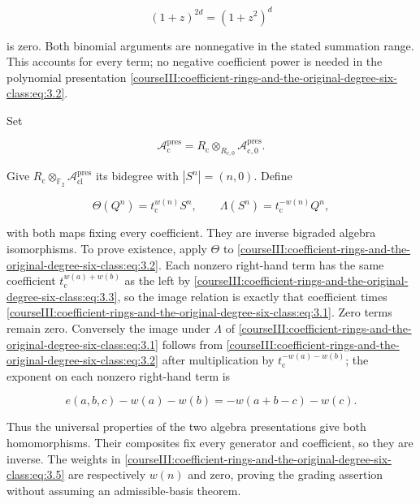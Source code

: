 \begin{equation}
(1+z)^{2d}=(1+z^2)^d
 \label{courseIII:coefficient-rings-and-the-original-degree-six-class:eq:3.4}
\end{equation}

is zero. Both binomial arguments are nonnegative in the stated summation range. This accounts for every term; no negative coefficient power is needed in the polynomial presentation \eqref{courseIII:coefficient-rings-and-the-original-degree-six-class:eq:3.2}.

Set

\[
 \mathcal A_{\mathrm c}^{\mathrm{pres}}
   =R_{\mathrm c}\otimes_{R_{\mathrm c,0}}
                         \mathcal A_{\mathrm c,0}^{\mathrm{pres}}.
\]

Give \(R_{\mathrm c}\otimes_{\mathbb F_2}
\mathcal A_{\mathrm{cl}}^{\mathrm{pres}}\) its bidegree with
\(|S^n|=(n,0)\). Define

\begin{equation}
\Theta(Q^n)=t_{\mathrm c}^{w(n)}S^n,
 \qquad
 \Lambda(S^n)=t_{\mathrm c}^{-w(n)}Q^n,
 \label{courseIII:coefficient-rings-and-the-original-degree-six-class:eq:3.5}
\end{equation}

with both maps fixing every coefficient. They are inverse bigraded algebra isomorphisms. To prove existence, apply \(\Theta\) to \eqref{courseIII:coefficient-rings-and-the-original-degree-six-class:eq:3.2}. Each nonzero right-hand term has the same coefficient \(t_{\mathrm c}^{w(a)+w(b)}\) as the left by \eqref{courseIII:coefficient-rings-and-the-original-degree-six-class:eq:3.3}, so the image relation is exactly that coefficient times \eqref{courseIII:coefficient-rings-and-the-original-degree-six-class:eq:3.1}. Zero terms remain zero. Conversely the image under \(\Lambda\) of \eqref{courseIII:coefficient-rings-and-the-original-degree-six-class:eq:3.1} follows from \eqref{courseIII:coefficient-rings-and-the-original-degree-six-class:eq:3.2} after multiplication by \(t_{\mathrm c}^{-w(a)-w(b)}\); the exponent on each nonzero right-hand term is

\begin{equation}
e(a,b,c)-w(a)-w(b)
                  =-w(a+b-c)-w(c).
 \label{courseIII:coefficient-rings-and-the-original-degree-six-class:eq:3.6}
\end{equation}

Thus the universal properties of the two algebra presentations give both homomorphisms. Their composites fix every generator and coefficient, so they are inverse. The weights in \eqref{courseIII:coefficient-rings-and-the-original-degree-six-class:eq:3.5} are respectively \(w(n)\) and zero, proving the grading assertion without assuming an admissible-basis theorem.

